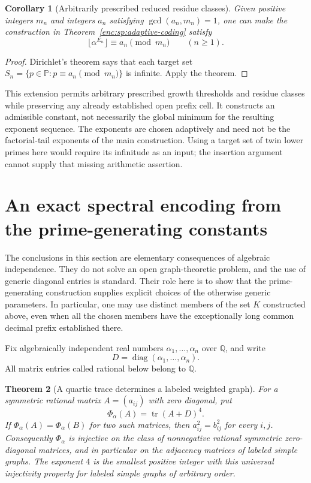 \documentclass[11pt,a4paper]{article}
\newtheorem{theorem}{Theorem}[section]
\newtheorem{corollary}[theorem]{Corollary}
\theoremstyle{definition}
\theoremstyle{remark}
\numberwithin{equation}{section}
\begin{document}
\begin{corollary}[Arbitrarily prescribed reduced residue classes]
\label{enc:sp:residue-coding}
Given positive integers $m_n$ and integers $a_n$ satisfying
$\gcd(a_n,m_n)=1$, one can make the construction in
Theorem~\ref{enc:sp:adaptive-coding} satisfy
\[
 \lfloor\alpha^{E_n}\rfloor\equiv a_n\pmod{m_n}
 \qquad(n\ge1).
\]
\end{corollary}
\begin{proof}
Dirichlet's theorem says that each target set
$S_n=\{p\in\mathbb P:p\equiv a_n\pmod{m_n}\}$ is infinite. Apply the
theorem.
\end{proof}

This extension permits arbitrary prescribed growth thresholds and
residue classes while preserving any already established open prefix
cell. It constructs an admissible constant, not necessarily the global
minimum for the resulting exponent sequence. The exponents are chosen
adaptively and need not be the factorial-tail exponents of the main
construction. Using a target set of twin lower primes here would require
its infinitude as an input; the insertion argument cannot supply that
missing arithmetic assertion.


\section{An exact spectral encoding from the prime-generating constants}
\label{enc:sec:spectral-applications}

The conclusions in this section are elementary consequences of algebraic
independence.  They do not solve an open graph-theoretic problem, and the
use of generic diagonal entries is standard.  Their role here is to show
that the prime-generating construction supplies explicit choices of the
otherwise generic parameters.  In particular, one may use distinct
members of the set $K$ constructed above, even when all the chosen
members have the exceptionally long common decimal prefix established
there.

Fix algebraically independent real numbers $\alpha_1,\ldots,\alpha_n$
over $\mathbb Q$, and write
\[
 D=\operatorname{diag}(\alpha_1,\ldots,\alpha_n).
\]
All matrix entries called rational below belong to $\mathbb Q$.

\begin{theorem}[A quartic trace determines a labeled weighted graph]
\label{enc:thm:quartic-encoding}
For a symmetric rational matrix $A=(a_{ij})$ with zero diagonal, put
\[
 \Phi_\alpha(A)=\operatorname{tr}(A+D)^4.
\]
If $\Phi_\alpha(A)=\Phi_\alpha(B)$ for two such matrices, then
$a_{ij}^2=b_{ij}^2$ for every $i,j$.
Consequently $\Phi_\alpha$ is injective on the class of nonnegative
rational symmetric zero-diagonal matrices, and in particular on the
adjacency matrices of labeled simple graphs.
The exponent $4$ is the smallest positive integer with this universal
injectivity property for labeled simple graphs of arbitrary order.
\end{theorem}
\end{document}
